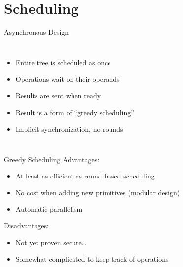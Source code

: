 \documentclass[t,noamsthm]{beamer}
\begin{document}
\section{Scheduling}

\begin{frame}{Asynchronous Design}

  \begin{columns}




    \begin{itemize}
    \item Entire tree is scheduled as once
    \item Operations wait on their operands
    \item Results are sent when ready
    \item Result is a form of ``greedy scheduling''
    \item Implicit synchronization, no rounds
    \end{itemize}

  \end{columns}

\end{frame}

\begin{frame}{Greedy Scheduling}
  Advantages:
  \begin{itemize}
  \item At least as efficient as round-based scheduling
  \item No cost when adding new primitives (modular design)
  \item Automatic parallelism
  \end{itemize}

  Disadvantages:
  \begin{itemize}
  \item Not yet proven secure\dots
  \item Somewhat complicated to keep track of operations
  \end{itemize}
\end{frame}
\end{document}
